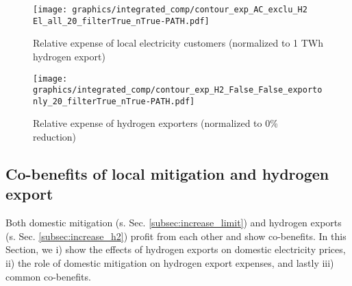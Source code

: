 \begin{figure*}[h!]
    \centering
    \begin{subfigure}[b]{0.49\linewidth}
        \centering
        \texttt{[image: graphics/integrated\_comp/contour\_exp\_AC\_exclu\_H2 El\_all\_20\_filterTrue\_nTrue-PATH.pdf]}
        \caption{Relative expense of local electricity customers (normalized to 1 TWh hydrogen export)}
        \label{fig:expense_ac}
    \end{subfigure}
    \hfill
    \begin{subfigure}[b]{0.49\linewidth}
        \centering
        \texttt{[image: graphics/integrated\_comp/contour\_exp\_H2\_False\_False\_exportonly\_20\_filterTrue\_nTrue-PATH.pdf]}
        \caption{Relative expense of hydrogen exporters (normalized to 0\% \co reduction)}
        \label{fig:expense_h2}
    \end{subfigure}
    \hfill
    \caption{  
    Expenses of local electricity consumers (\ref{fig:expense_ac}) and hydrogen exporters (\ref{fig:expense_h2}),
    normalized to expenses at 1 TWh hydrogen export (\ref{fig:expense_ac}) and
    to 0\% \co reduction (\ref{fig:expense_h2})
    at each mitigation level. Local electricity consumers profit from increasing hydrogen exports, especially at low domestic mitigation and high exports. Hydrogen exporters profit from domestic mitigation at medium mitigation efforts. Both (\ref{fig:expense_ac}) and (\ref{fig:expense_h2}) include possible pathways of i) quick exports and slow mitigation, ii) balanced exports and mitigation and iii) slow exports and quick mitigation.}
    \label{fig:expenses_default}
\end{figure*}



\subsection{Co-benefits of local mitigation and hydrogen export}
\label{subsec:benefits}

Both domestic mitigation (s. Sec. \ref{subsec:increase_limit}) and hydrogen exports (s. Sec. \ref{subsec:increase_h2}) profit from each other and show co-benefits. In this Section, we i) show the effects of hydrogen exports on domestic electricity prices, ii) the role of domestic mitigation on hydrogen export expenses, and lastly iii) common co-benefits.

